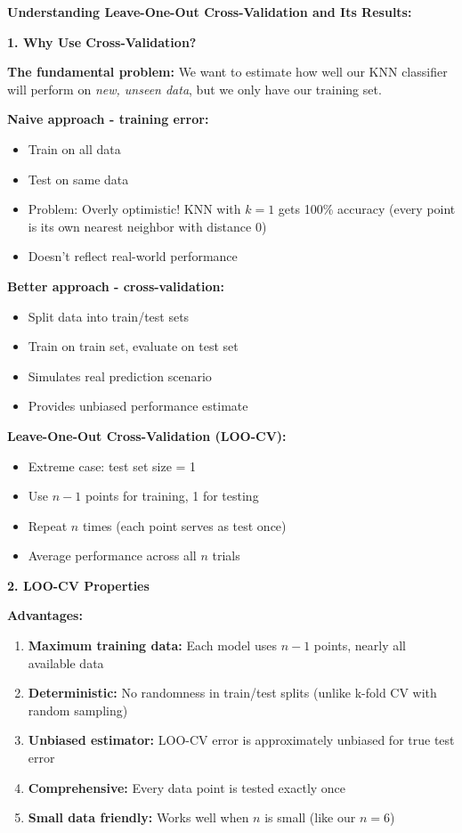 \documentclass[12pt]{article}
\begin{document}
\begin{explanation}
\textbf{Understanding Leave-One-Out Cross-Validation and Its Results:}

\textbf{1. Why Use Cross-Validation?}

\textbf{The fundamental problem:} We want to estimate how well our KNN classifier will perform on \textit{new, unseen data}, but we only have our training set.

\textbf{Naive approach - training error:}
\begin{itemize}
    \item Train on all data
    \item Test on same data
    \item Problem: Overly optimistic! KNN with \(k=1\) gets 100\% accuracy (every point is its own nearest neighbor with distance 0)
    \item Doesn't reflect real-world performance
\end{itemize}

\textbf{Better approach - cross-validation:}
\begin{itemize}
    \item Split data into train/test sets
    \item Train on train set, evaluate on test set
    \item Simulates real prediction scenario
    \item Provides unbiased performance estimate
\end{itemize}

\textbf{Leave-One-Out Cross-Validation (LOO-CV):}
\begin{itemize}
    \item Extreme case: test set size = 1
    \item Use \(n-1\) points for training, 1 for testing
    \item Repeat \(n\) times (each point serves as test once)
    \item Average performance across all \(n\) trials
\end{itemize}

\textbf{2. LOO-CV Properties}

\textbf{Advantages:}
\begin{enumerate}
    \item \textbf{Maximum training data:} Each model uses \(n-1\) points, nearly all available data
    \item \textbf{Deterministic:} No randomness in train/test splits (unlike k-fold CV with random sampling)
    \item \textbf{Unbiased estimator:} LOO-CV error is approximately unbiased for true test error
    \item \textbf{Comprehensive:} Every data point is tested exactly once
    \item \textbf{Small data friendly:} Works well when \(n\) is small (like our \(n=6\))
\end{enumerate}


\end{explanation}
\end{document}
